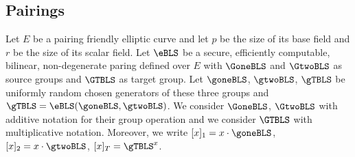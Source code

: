 \subsection{Pairings}
\label{sec:pairings}

\noindent Let $E$ be a pairing friendly elliptic curve and let $p$ be the size of its base field and $r$ 
be the size of its scalar field. Let $\eBLS$ be a secure, efficiently computable, 
bilinear, non-degenerate paring defined over $E$ with $\GoneBLS$ and $\GtwoBLS$ as source groups and 
$\GTBLS$ as target group. Let  $\goneBLS$, $\gtwoBLS$, $\gTBLS$ be uniformly random chosen generators 
of these three groups and $\gTBLS = \eBLS(\goneBLS, \gtwoBLS)$. We consider $\GoneBLS$, $\GtwoBLS$ with 
additive notation for their group operation and we consider $\GTBLS$ with multiplicative notation. Moreover, we 
write $[x]_{1} = x \cdot \goneBLS$, $[x]_{2} = x \cdot \gtwoBLS$,  $[x]_{T} = \gTBLS^x$. \\
